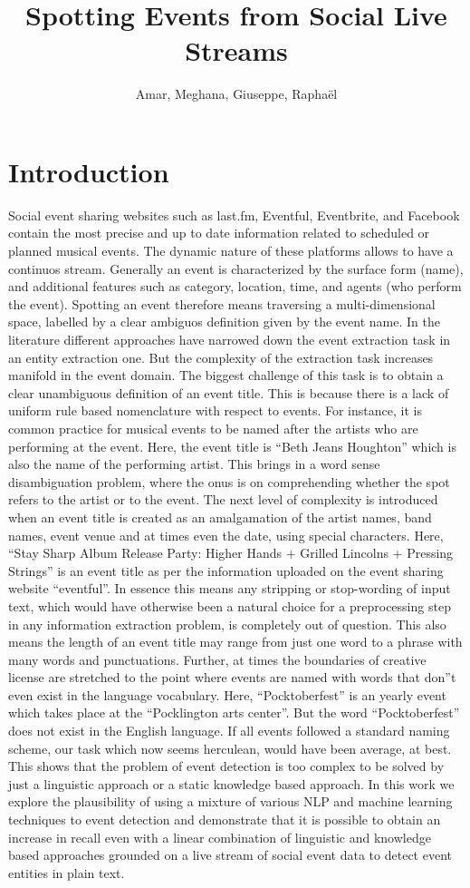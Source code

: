 \documentclass[10pt,a4paper]{article}
\author{Amar, Meghana, Giuseppe, Rapha\"el}
\title{Spotting Events from Social Live Streams}
\begin{document}
\maketitle
\section{Introduction}
Social event sharing websites such as last.fm, Eventful, Eventbrite, and Facebook contain the most precise and up to date information related to scheduled or planned musical events. The dynamic nature of these platforms allows to have a continuos stream. Generally an event is characterized by the surface form (name), and additional features such as category, location, time, and agents (who perform the event). Spotting an event therefore means traversing a multi-dimensional space, labelled by a clear ambiguos definition given by the event name. 
In the literature different approaches have narrowed down the event extraction task in an entity extraction one. But the complexity of the extraction task increases manifold in the event domain. The biggest challenge of this task is to obtain a clear unambiguous definition of an event title. This is because there is a lack of uniform rule based nomenclature with respect to events. For instance, it is common practice for musical events to be named after the artists who are performing at the event. Here, the event title is ``Beth Jeans Houghton'' which is also the name of the performing artist. This brings in a word sense disambiguation problem, where the onus is on comprehending whether the spot refers to the artist or to the event. The next level of complexity is introduced when an event title is created as an amalgamation of the artist names, band names, event venue and at times even the date, using special characters. Here, ``Stay Sharp Album Release Party: Higher Hands + Grilled Lincolns + Pressing Strings'' is an event title as per the information uploaded on the event sharing website ``eventful''. In essence this means any stripping or stop-wording of input text, which would have otherwise been a natural choice for a preprocessing step in any information extraction problem, is completely out of question. This also means the length of an event title may range from just one word to a phrase with many words and punctuations. Further, at times the boundaries of creative license are stretched to the point where events are named with words that don''t even exist in the language vocabulary. Here, ``Pocktoberfest'' is an yearly event which takes place at the ``Pocklington arts center''. But the word ``Pocktoberfest'' does not exist in the English language. If all events followed a standard naming scheme, our task which now seems herculean, would have been average, at best. This shows that the problem of event detection is too complex to be solved by just a linguistic approach or a static knowledge based approach. In this work we explore the plausibility of using a mixture of various NLP and machine learning techniques to event detection and demonstrate that it is possible to obtain an increase in recall even with a linear combination of linguistic and knowledge based approaches grounded on a live stream of social event data to detect event entities in plain text.
\end{document}
